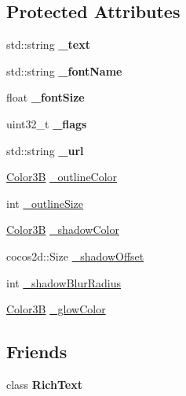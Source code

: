 \subsection*{Protected Attributes}
\begin{DoxyCompactItemize}
\item 
\mbox{\label{classui_1_1RichElementText_a2dbe3e19f5f821d6f8cf7f1de7c3e0ed}} 
std\+::string {\bfseries \+\_\+text}
\item 
\mbox{\label{classui_1_1RichElementText_ac2c6ce66238a71e75de6c22d7de9b2e6}} 
std\+::string {\bfseries \+\_\+font\+Name}
\item 
\mbox{\label{classui_1_1RichElementText_a5e17e19bf0d582e1143903acc8a9d607}} 
float {\bfseries \+\_\+font\+Size}
\item 
\mbox{\label{classui_1_1RichElementText_a9a5139fb437e84d367c99f431273bf41}} 
uint32\+\_\+t {\bfseries \+\_\+flags}
\item 
\mbox{\label{classui_1_1RichElementText_acddcad1d25de86abee554f7a05464c44}} 
std\+::string {\bfseries \+\_\+url}
\item 
\hyperlink{structColor3B}{Color3B} \hyperlink{classui_1_1RichElementText_ab87c5d3c9ec546cc1c4da32a4e663add}{\+\_\+outline\+Color}
\item 
int \hyperlink{classui_1_1RichElementText_a1f104cf90df7357d5969523b8ccd3463}{\+\_\+outline\+Size}
\item 
\hyperlink{structColor3B}{Color3B} \hyperlink{classui_1_1RichElementText_afc1ed7b62220b13b1fe9f9cf04697165}{\+\_\+shadow\+Color}
\item 
cocos2d\+::\+Size \hyperlink{classui_1_1RichElementText_a77a101d659638abce928382ff04a022f}{\+\_\+shadow\+Offset}
\item 
int \hyperlink{classui_1_1RichElementText_a1f9430c10e489a9dadf727b83bb279eb}{\+\_\+shadow\+Blur\+Radius}
\item 
\hyperlink{structColor3B}{Color3B} \hyperlink{classui_1_1RichElementText_ab936ed0c88c41074d2a1cce70ea6d3c0}{\+\_\+glow\+Color}
\end{DoxyCompactItemize}
\subsection*{Friends}
\begin{DoxyCompactItemize}
\item 
\mbox{\label{classui_1_1RichElementText_a0e450ad30cc76fbbd86270e035cc8790}} 
class {\bfseries Rich\+Text}
\end{DoxyCompactItemize}
